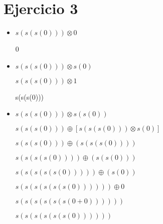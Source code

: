 \documentclass{article}
\begin{document}
 \section{Ejercicio 3}
\begin{itemize}
    \item {$s(s(s(0))) \otimes 0$} 
\begin{flushleft}
      0  
\end{flushleft}
   \item{$s(s(s(0))) \otimes s(0)$}
\begin{flushleft}
    $s(s(s(0))) \otimes 1$
\end{flushleft}
\begin{flushleft}
    s(s(s(0)))
\end{flushleft}

    \item {$ s(s(s(0))) \otimes  s(s(0))$}
\begin{flushleft}
    $s(s(s(0))) \oplus [s(s(s(0))) \otimes s(0) ]$
\end{flushleft}
\begin{flushleft}
    $s(s(s(0))) \oplus (s(s(s(0))))$
\end{flushleft}
\begin{flushleft}
    $s(s(s(s(0)))) \oplus (s(s(0)))$
\end{flushleft}
\begin{flushleft}
    $s(s(s(s(s(0))))) \oplus (s(0))$
\end{flushleft}
\begin{flushleft}
   $s(s(s(s(s(s(0)))))) \oplus 0$
\end{flushleft}
\begin{flushleft}
    $s(s(s(s(s(s(0+0))))))$
\end{flushleft}
\begin{flushleft}
    $s(s(s(s(s(s(0))))))$
\end{flushleft}
\end{itemize}
\end{document}
